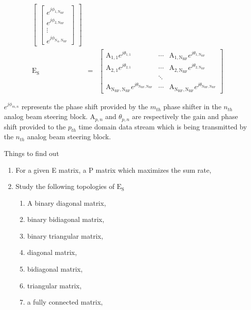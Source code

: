 \begin{eqnarray}
\begin{bmatrix}
 \begin{bmatrix} e^{j\phi_{1,\text{N}_\text{RF}}}\\ e^{j\phi_{2,\text{N}_\text{RF}}}\\ \vdots \\e^{j\phi_{\text{N}_\text{A},\text{N}_\text{RF}}}\end{bmatrix}
\end{bmatrix} \\
 \text{E}_\text{S} &=&
\begin{bmatrix}
\text{A}_{1,1}e^{j\theta_{1,1}} &  \cdots& \text{A}_{1,\text{N}_\text{RF}}e^{j\theta_{1,\text{N}_\text{RF}}} \\
\text{A}_{2,1}e^{j\theta_{2,1}} &  \cdots &\text{A}_{2,\text{N}_\text{RF}}e^{j\theta_{2,\text{N}_\text{RF}}} \\
&\ddots&\\
\text{A}_{\text{N}_\text{RF},\text{N}_\text{RF}}e^{j\theta_{\text{N}_\text{RF},\text{N}_\text{RF}}} &  \cdots &\text{A}_{\text{N}_\text{RF},\text{N}_\text{RF}}e^{j\theta_{\text{N}_\text{RF},\text{N}_\text{RF}}} 
\end{bmatrix}
\end{eqnarray}

$e^{j\phi_{m,n}}$ represents the phase shift provided by the $m_{th}$ phase shifter  in the $n_{th}$ analog beam steering block. $\text{A}_{p,n}$ and $\theta_{p,n}$ are respectively the gain and phase shift provided to the $p_{th}$ time domain data stream which is being transmitted by the $n_{th}$ analog beam steering block.

Things to find out
\begin{enumerate}
	\item For a given E matrix, a P matrix which maximizes the sum rate,
	\item Study the following topologies of $\text{E}_\text{S}$
	\begin{enumerate}
		\item A binary diagonal matrix,
		\item binary bidiagonal matrix,
		\item binary triangular matrix,
		\item diagonal matrix,
		\item bidiagonal matrix,
		\item triangular matrix,
		\item a fully connected matrix,
	\end{enumerate}
\end{enumerate}